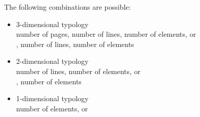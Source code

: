 The following combinations are possible:
\begin{itemize}
\item 3-dimensional typology\\
number of pages, number of lines, number of elements\code{)}, or\\
, number of lines, number of elements\code{)}
\item 2-dimensional typology\\
number of lines, number of elements\code{)}, or\\
, number of elements\code{)}
\item 1-dimensional typology\\
number of elements\code{)}, or\\
\end{itemize}


